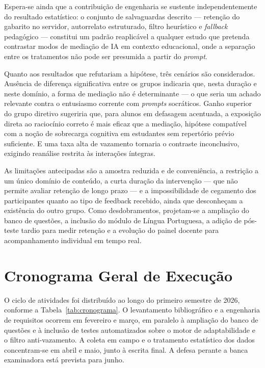\documentclass[10pt, a4paper, twocolumn]{article}
\begin{document}
Espera-se ainda que a contribuição de engenharia se sustente
independentemente do resultado estatístico: o conjunto de salvaguardas descrito
--- retenção do gabarito no servidor, autorrelato estruturado, filtro heurístico
e \textit{fallback} pedagógico --- constitui um padrão reaplicável a qualquer
estudo que pretenda contrastar modos de mediação de IA em contexto educacional,
onde a separação entre os tratamentos não pode ser presumida a partir do
\textit{prompt}.

Quanto aos resultados que refutariam a hipótese, três cenários são
considerados. Ausência de diferença significativa entre os grupos indicaria que,
nesta duração e neste domínio, a forma de mediação não é determinante --- o que
seria um achado relevante contra o entusiasmo corrente com \textit{prompts}
socráticos. Ganho superior do grupo diretivo sugeriria que, para alunos em
defasagem acentuada, a exposição direta ao raciocínio correto é mais eficaz que a
mediação, hipótese compatível com a noção de sobrecarga cognitiva em estudantes
sem repertório prévio suficiente. E uma taxa alta de vazamento tornaria o
contraste inconclusivo, exigindo reanálise restrita às interações íntegras.

As limitações antecipadas são a amostra reduzida e de conveniência, a restrição
a um único domínio de conteúdo, a curta duração da intervenção --- que não
permite avaliar retenção de longo prazo --- e a impossibilidade de cegamento dos
participantes quanto ao tipo de feedback recebido, ainda que desconheçam a
existência do outro grupo. Como desdobramentos, projetam-se a ampliação do banco
de questões, a inclusão do módulo de Língua Portuguesa, a adição de pós-teste
tardio para medir retenção e a evolução do painel docente para acompanhamento
individual em tempo real.

\section{Cronograma Geral de Execução}
\label{sec:cronograma}

O ciclo de atividades foi distribuído ao longo do primeiro semestre de 2026,
conforme a Tabela~\ref{tab:cronograma}. O levantamento bibliográfico e a
engenharia de requisitos ocorrem em fevereiro e março, em paralelo à ampliação do
banco de questões e à inclusão de testes automatizados sobre o motor de
adaptabilidade e o filtro anti-vazamento. A coleta em campo e o tratamento
estatístico dos dados concentram-se em abril e maio, junto à escrita final. A
defesa perante a banca examinadora está prevista para junho.
\end{document}
